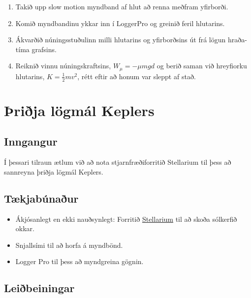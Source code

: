\documentclass[oneside]{book}
\theoremstyle{definition}
\begin{document}
\begin{enumerate}[label = (\roman*)]
    \item Takið upp slow motion myndband af hlut að renna meðfram yfirborði.

\item Komið myndbandinu ykkar inn í LoggerPro og greinið feril hlutarins.

\item Ákvarðið núningsstuðulinn milli hlutarins og yfirborðsins út frá lögun hraða-tíma grafsins.

\item Reiknið vinnu núningskraftsins, $W_\mu = -\mu mgd$ og berið saman við hreyfiorku hlutarins, $K = \frac{1}{2}mv^2$, rétt eftir að honum var sleppt af stað.

\end{enumerate}

\newpage

\section{Þriðja lögmál Keplers}

\subsection*{Inngangur}

Í þessari tilraun ætlum við að nota stjarnfræðiforritið Stellarium til þess að sannreyna þriðja lögmál Keplers.

\subsection*{Tækjabúnaður}

\begin{itemize}

    \item Ákjósanlegt en ekki nauðsynlegt: Forritið \href{http://stellarium.org/}{Stellarium} til að skoða sólkerfið okkar.
    
    \item Snjallsími til að horfa á myndbönd.
    
    \item Logger Pro til þess að myndgreina gögnin.
\end{itemize}

\subsection*{Leiðbeiningar}
\end{document}
